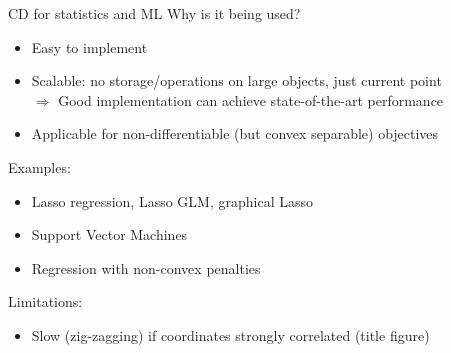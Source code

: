 \documentclass[11pt,compress,t,notes=noshow, xcolor=table]{beamer}
\begin{document}
\begin{framev}{CD for statistics and ML}
Why is it being used?
\begin{itemize}
\item Easy to implement
\item Scalable: no storage/operations on large objects,
just current point \\
$\Rightarrow$ Good implementation can achieve state-of-the-art performance
\item Applicable for non-differentiable (but convex separable) objectives
\end{itemize}
\spacer
Examples:
\begin{itemize}
\item Lasso regression, Lasso GLM, graphical Lasso
\item Support Vector Machines
\item Regression with non-convex penalties
\end{itemize}
\spacer
Limitations:
\begin{itemize}
\item Slow (zig-zagging) if coordinates strongly correlated (title figure)
\end{itemize}
\end{framev}

\endlecture
\end{document}
